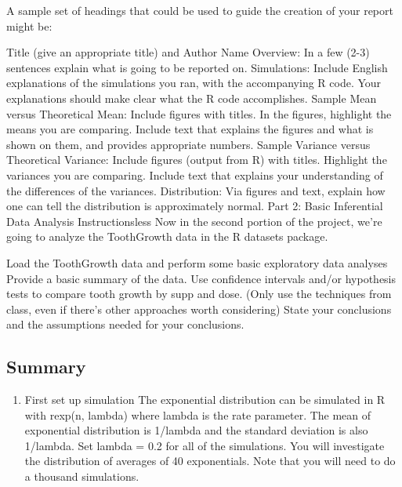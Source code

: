 \documentclass[]{article}
\providecommand{\tightlist}{%
  \setlength{\itemsep}{0pt}\setlength{\parskip}{0pt}}
\begin{document}
A sample set of headings that could be used to guide the creation of
your report might be:

Title (give an appropriate title) and Author Name Overview: In a few
(2-3) sentences explain what is going to be reported on. Simulations:
Include English explanations of the simulations you ran, with the
accompanying R code. Your explanations should make clear what the R code
accomplishes. Sample Mean versus Theoretical Mean: Include figures with
titles. In the figures, highlight the means you are comparing. Include
text that explains the figures and what is shown on them, and provides
appropriate numbers. Sample Variance versus Theoretical Variance:
Include figures (output from R) with titles. Highlight the variances you
are comparing. Include text that explains your understanding of the
differences of the variances. Distribution: Via figures and text,
explain how one can tell the distribution is approximately normal. Part
2: Basic Inferential Data Analysis Instructionsless Now in the second
portion of the project, we're going to analyze the ToothGrowth data in
the R datasets package.

Load the ToothGrowth data and perform some basic exploratory data
analyses Provide a basic summary of the data. Use confidence intervals
and/or hypothesis tests to compare tooth growth by supp and dose. (Only
use the techniques from class, even if there's other approaches worth
considering) State your conclusions and the assumptions needed for your
conclusions.

\hypertarget{summary}{%
\subsection{Summary}\label{summary}}

\begin{enumerate}
\def\labelenumi{\arabic{enumi}.}
\tightlist
\item
  First set up simulation The exponential distribution can be simulated
  in R with rexp(n, lambda) where lambda is the rate parameter. The mean
  of exponential distribution is 1/lambda and the standard deviation is
  also 1/lambda. Set lambda = 0.2 for all of the simulations. You will
  investigate the distribution of averages of 40 exponentials. Note that
  you will need to do a thousand simulations.
\end{enumerate}
\end{document}
